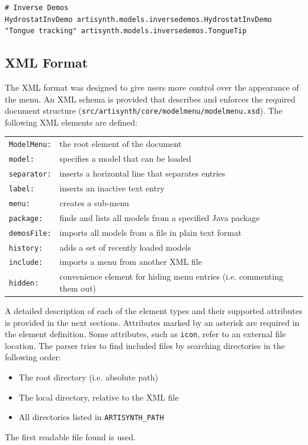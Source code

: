 \documentclass{article}
\begin{document}
\begin{lstlisting}[]
# Inverse Demos
HydrostatInvDemo artisynth.models.inversedemos.HydrostatInvDemo
"Tongue tracking" artisynth.models.inversedemos.TongueTip   
\end{lstlisting}

\subsection{XML Format \label{sec:menu:xml}}

The XML format was designed to give users more control over the appearance of
the menu.  An XML schema is provided that describes and enforces the required
document structure ({\tt src/artisynth/core/modelmenu/modelmenu.xsd}).  The 
following XML elements are defined:
\medskip

\begin{tabular}{ll}
{\tt ModelMenu:} & the root element of the document\\
{\tt model:} & specifies a model that can be loaded\\
{\tt separator:} & inserts a horizontal line that separates entries\\
{\tt label:} & inserts an inactive text entry\\
{\tt menu:} & creates a sub-menu\\
{\tt package:} & finds and lists all models from a specified Java package\\
{\tt demosFile:} & imports all models from a file in plain text format\\
{\tt history:} & adds a set of recently loaded models\\
{\tt include:} & imports a menu from another XML file\\
{\tt hidden: } & convenience element for hiding menu entries (i.e. commenting
   them out)
\end{tabular}
\medskip

A detailed description of each of the element types and their supported 
attributes is provided in the next sections.  Attributes marked by an asterisk
are required in the element definition.  Some attributes, such as {\tt icon}, 
refer to an external file location.  The parser tries to find included files 
by searching directories in the  following order:
\begin{itemize}
  \setlength{\itemsep}{0pt}
  \item The root directory (i.e. absolute path)
  \item The local directory, relative to the XML file
  \item All directories listed in {\tt ARTISYNTH\_PATH}
\end{itemize}
The first readable file found is used.
\end{document}
